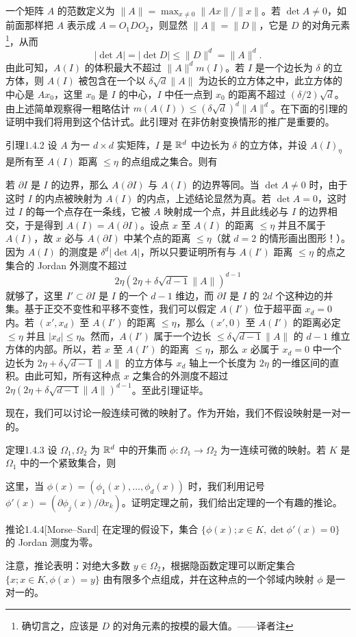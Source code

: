 一个矩阵 $A$ 的范数定义为 $\|A\|=\max_{x\ne0}\|Ax\|/\|x\|$。若 $\det A\ne0$，如前面那样把 $A$ 表示成 $A=O_1DO_2$，则显然 $\|A\|=\|D\|$，它是 $D$ 的对角元素\footnote{确切言之，应该是 $D$ 的对角元素的按模的最大值。——译者注}，从而
\[|\det A|=|\det D|\le\|D\|^d=\|A\|^d.\]
由此可知，$A(I)$ 的体积最大不超过 $\|A\|^dm(I)$。若 $I$ 是一个边长为 $\delta$ 的立方体，则 $A(I)$ 被包含在一个以 $\delta\sqrt d\|A\|$ 为边长的立方体之中，此立方体的中心是 $Ax_0$，这里 $x_0$ 是 $I$ 的中心，$I$ 中任一点到 $x_0$ 的距离不超过 $(\delta/2)\sqrt d$。由上述简单观察得一粗略估计 $m(A(I))\le(\delta\sqrt d)^d\|A\|^d$。在下面的引理的证明中我们将用到这个估计式。此引理对  在非仿射变换情形的推广是重要的。
\begin{statement}{引理}{1.4.2}
设 $A$ 为一 $d\times d$ 实矩阵，$I$ 是 $\mathbb R^d$ 中边长为 $\delta$ 的立方体，并设 $A(I)_\eta$ 是所有至 $A(I)$ 距离 $\le\eta$ 的点组成之集合。则有
\end{statement}
\Proof 若 $\partial I$ 是 $I$ 的边界，那么 $A(\partial I)$ 与 $A(I)$ 的边界等同。当 $\det A\ne0$ 时，由于这时 $I$ 的内点被映射为 $A(I)$ 的内点，上述结论显然为真。若 $\det A=0$，这时过 $I$ 的每一个点存在一条线，它被 $A$ 映射成一个点，并且此线必与 $I$ 的边界相交，于是得到 $A(I)=A(\partial I)$。设点 $x$ 至 $A(I)$ 的距离 $\le\eta$ 并且不属于 $A(I)$，故 $x$ 必与 $A(\partial I)$ 中某个点的距离 $\le\eta$（就 $d=2$ 的情形画出图形！）。因为 $A(I)$ 的测度是 $\delta^d|\det A|$，所以只要证明所有与 $A(I')$ 距离 $\le\eta$ 的点之集合的 Jordan 外测度不超过
\[2\eta(2\eta+\delta\sqrt{d-1}\|A\|)^{d-1}\]
就够了，这里 $I'\subset\partial I$ 是 $I$ 的一个 $d-1$ 维边，而 $\partial I$ 是 $I$ 的 $2d$ 个这种边的并集。基于正交不变性和平移不变性，我们可以假定 $A(I')$ 位于超平面 $x_d=0$ 内。若 $(x',x_d)$ 至 $A(I')$ 的距离 $\le\eta$，那么 $(x',0)$ 至 $A(I')$ 的距离必定 $\le\eta$ 并且 $|x_d|\le\eta$。然而，$A(I')$ 属于一个边长 $\le\delta\sqrt{d-1}\|A\|$ 的 $d-1$ 维立方体的内部。所以，若 $x$ 至 $A(I')$ 的距离 $\le\eta$，那么 $x$ 必属于 $x_d=0$ 中一个边长为 $2\eta+\delta\sqrt{d-1}\|A\|$ 的立方体与 $x_d$ 轴上一个长度为 $2\eta$ 的一维区间的直积。由此可知，所有这种点 $x$ 之集合的外测度不超过 $2\eta(2\eta+\delta\sqrt{d-1}\|A\|)^{d-1}$。至此引理证毕。

现在，我们可以讨论一般连续可微的映射了。作为开始，我们不假设映射是一对一的。
\begin{statement}{定理}{1.4.3}
设 $\Omega_1,\Omega_2$ 为 $\mathbb R^d$ 中的开集而 $\phi:\Omega_1\to\Omega_2$ 为一连续可微的映射。若 $K$ 是 $\Omega_1$ 中的一个紧致集合，则
\end{statement}
这里，当 $\phi(x)=(\phi_1(x),\ldots,\phi_d(x))$ 时，我们利用记号 $\phi'(x)=(\partial\phi_j(x)/\partial x_k)$。证明定理之前，我们给出定理的一个有趣的推论。
\begin{statement}{推论}{1.4.4}[Morse--Sard]
在定理的假设下，集合 $\{\phi(x);x\in K,\det\phi'(x)=0\}$ 的 Jordan 测度为零。
\end{statement}
注意，推论表明：对绝大多数 $y\in\Omega_2$，根据隐函数定理可以断定集合 $\{x;x\in K,\phi(x)=y\}$ 由有限多个点组成，并在这种点的一个邻域内映射 $\phi$ 是一对一的。

